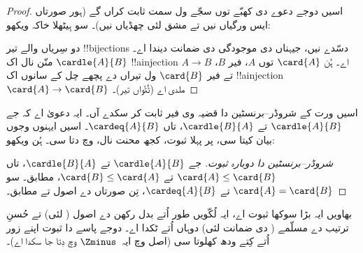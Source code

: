 \documentclass[../../../include/open-logic-section]{subfiles}
\begin{document}
\begin{proof}
اسیں دوجے دعوے دی کھبّے توں سجّے ول سمت ثابت کراں گے (ہور صورتاں ایس ورگیاں نیں تے مشق لئی چھڈیاں نیں)۔ سو ہِیٹھلا خاکہ ویکھو:
\begin{center}
\end{center}
دو سِریاں والے تیر !!{bijection}s دسّدے نیں، جیہناں دی موجودگی دی ضمانت  دیندا اے۔ $\cardle{A}{B}$ منّن نال اک !!a{injection} $A\to B$ اے۔ ہُن $\card{A}$ توں $A$، فیر $B$، تے فیر $\card{B}$ ول تیراں دے پچھے چل کے سانوں اک !!a{injection} $\card{A} \to \card{B}$ ملدی اے (ٹُٹّواں تیر)۔
\end{proof}\noindent اسیں  ورت کے شروڈر–برنسٹین دا قضیہ وی فیر ثابت کر سکدے آں۔ ایہ دعویٰ اے کہ جے $\cardle{A}{B}$ تے $\cardle{B}{A}$، تاں $\cardeq{A}{B}$۔ اسیں ایہنوں  وجوں بیان کیتا سی، پر پہلا ثبوت، کجھ محنت نال،  وچ دتا سی۔ ہُن ویکھو:

\begin{proof}[شروڈر–برنسٹین دا دوبارہ ثبوت]
جے $\cardle{A}{B}$ تے $\cardle{B}{A}$، تاں $\card{A} \leq \card{B}$ تے $\card{B} \leq \card{A}$،  مطابق۔ سو $\card{A} = \card{B}$ تے $\cardeq{A}{B}$، تِن صورتاں دے اصول تے  مطابق۔
\end{proof}
\noindent
بھاویں ایہ بڑا سوکھا ثبوت اے، ایہ لُکّویں طور اُتے بدل رکھن دے اصول ( لئی) تے حُسنِ ترتیب دے مسلّمے ( دی ضمانت لئی) دوہاں اُتے ٹکدا اے۔ دوجے پاسے  دا ثبوت اپنے زور اُتے کِتے ودھ کھلوتا سی (اصل وچ ایہ~$\Zminus$ وچ دِتا جا سکدا اے)۔
\end{document}

